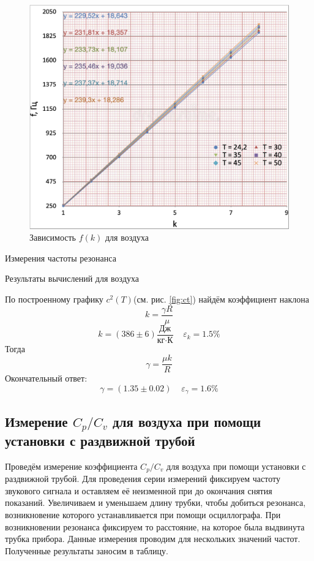 \documentclass[12pt,a4paper]{article}
\begin{document}
		
\begin{figure}[H]
	\includegraphics[width = 10.93 cm]{src/f(k).pdf}
	\caption{Зависимость $f(k)$ для воздуха}
	\label{fig:fk}
\end{figure}

\begin{table}[H]
	\caption{Измерения частоты резонанса}
	\label{tab:data}
	
\end{table}

\begin{table}[H]
	\caption{Результаты вычислений для воздуха}
	\label{tab:mnk}
	
\end{table}


По построенному графику $c^{2}(T)$(см. рис. \ref{fig:ct}) найдём коэффициент наклона $$k=\frac{\gamma{R}}{\mu}$$ 
$$k=(386 \pm 6)\frac{\text{Дж}}{\text{кг}\cdot \text{К}} \;\;\;\; \varepsilon_{k}=1.5\% $$
Тогда $$\gamma=\frac{\mu{k}}{R}$$ Окончательный ответ: 
$$\gamma=(1.35 \pm 0.02) \;\;\;\; \varepsilon_{\gamma}=1.6\%$$


\subsection*{Измерение $ C_p/C_v $ для воздуха при помощи установки с раздвижной трубой}
Проведём измерение коэффициента $ C_p/C_v $ для воздуха при помощи установки с раздвижной трубой.
Для проведения серии измерений фиксируем частоту звукового сигнала и оставляем её неизменной при до окончания снятия показаний.
Увеличиваем и уменьшаем длину трубки, чтобы добиться резонанса, возникновение которого устанавливается при помощи осциллографа.
При возникновении резонанса фиксируем то расстояние, на которое была выдвинута трубка прибора.
Данные измерения проводим для нескольких значений частот.
Полученные результаты заносим в таблицу.
\end{document}
